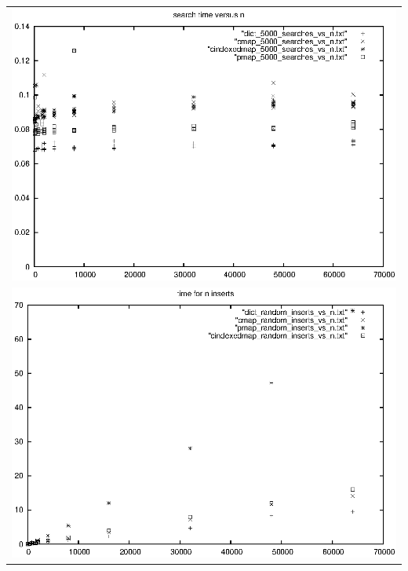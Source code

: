 \documentclass[11pt]{article}
\begin{document}
\begin{tabular}{c}
\includegraphics[width=6in]{search_time_vs_n} \\
\includegraphics[width=6in]{insert_time_vs_n} \\
\end{tabular}
\end{document}
